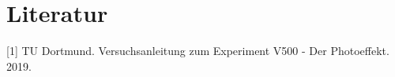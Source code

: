 \section{Literatur}

[1] TU Dortmund. Versuchsanleitung zum Experiment V500 - Der Photoeffekt. 2019.